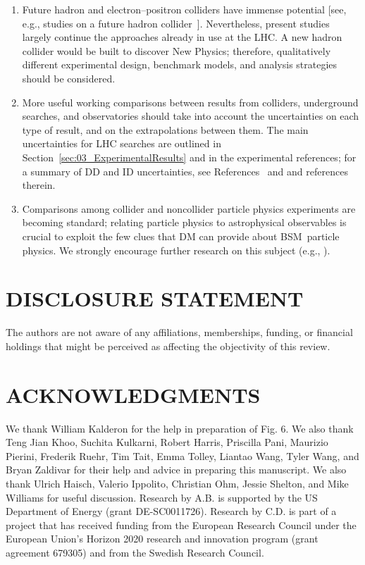 \documentclass{ar-1col}
\begin{document}
{\begin{issues}
\begin{enumerate}
\begin{itemize}
\end{itemize}

\item Future hadron and electron--positron colliders have immense
potential [see, e.g., studies on a future hadron
collider~\cite{Golling:2016gvc}]. Nevertheless, present studies
largely continue the approaches already in use at the LHC. A new
hadron collider would be built to discover New Physics;
therefore, qualitatively different experimental design, benchmark
models, and analysis strategies should be considered.

\item More useful working comparisons between results from colliders,
underground searches, and observatories should take into account
the uncertainties on each type of result, and on the
extrapolations between them. The main uncertainties for LHC
searches are outlined in
Section~\ref{sec:03_ExperimentalResults} and in the experimental
references; for a summary of DD and ID uncertainties, see
References~ and  and
references therein.

\item Comparisons among collider and noncollider particle physics
experiments are becoming standard; relating particle physics to
astrophysical observables is crucial to exploit the few clues that
DM can provide about BSM\ particle physics. We
strongly encourage further research on this subject (e.g.,
).
\end{enumerate}
\end{issues}


\section*{DISCLOSURE STATEMENT}

The authors are not aware of any affiliations, memberships,
funding, or financial holdings that might be perceived as
affecting the objectivity of this review.

\section*{ACKNOWLEDGMENTS}

We thank William Kalderon for the help in preparation of Fig. 6. We also thank Teng Jian Khoo, Suchita Kulkarni, Robert Harris, Priscilla Pani, Maurizio Pierini, Frederik Ruehr, Tim Tait, Emma Tolley, Liantao Wang, Tyler Wang, and Bryan Zaldivar for their help and advice in preparing this manuscript. We also thank Ulrich Haisch, Valerio Ippolito, Christian Ohm, Jessie Shelton, and Mike Williams for useful discussion. Research by A.B. is supported by the US Department of Energy (grant DE-SC0011726). Research by C.D. is part of a project that has received funding from the European Research Council under the European Union's Horizon 2020 research and innovation program (grant agreement 679305) and from the Swedish Research Council.

}
\end{document}
